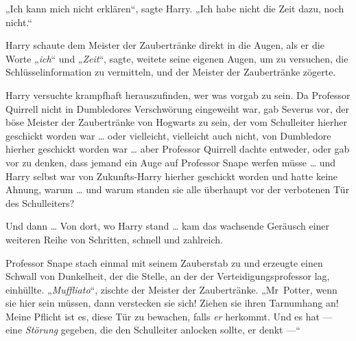 „Ich kann mich nicht erklären“, sagte Harry.
„Ich habe nicht die Zeit dazu, noch nicht.“

Harry schaute dem Meister der Zaubertränke direkt in die Augen, als er die Worte
„\emph{ich}“ und
„\emph{Zeit}“, sagte, weitete seine eigenen Augen, um zu versuchen, die Schlüsselinformation zu vermitteln, und der Meister der Zaubertränke zögerte.

Harry versuchte krampfhaft herauszufinden, wer was vorgab zu sein. Da Professor Quirrell nicht in Dumbledores Verschwörung eingeweiht war, gab Severus vor, der böse Meister der Zaubertränke von Hogwarts zu sein, der vom Schulleiter hierher geschickt worden war … oder vielleicht, vielleicht auch nicht, von Dumbledore hierher geschickt worden war … aber Professor Quirrell dachte entweder, oder gab vor zu denken, dass jemand ein Auge auf Professor Snape werfen müsse … und Harry selbst war von Zukunfts-Harry hierher geschickt worden und hatte keine Ahnung, warum … und warum standen sie alle überhaupt vor der verbotenen Tür des Schulleiters?



Und dann … Von dort, wo Harry stand … kam das wachsende Geräusch einer weiteren Reihe von Schritten, schnell und zahlreich.

Professor Snape stach einmal mit seinem Zauberstab zu und erzeugte einen Schwall von Dunkelheit, der die Stelle, an der der Verteidigungsprofessor lag, einhüllte.
„\emph{Muffliato}“, zischte der Meister der Zaubertränke.
„Mr~Potter, wenn sie hier sein müssen, dann verstecken sie sich! Ziehen sie ihren Tarnumhang an! Meine Pflicht ist es, diese Tür zu bewachen, falls \emph{er} herkommt. Und es hat — eine \emph{Störung} gegeben, die den Schulleiter anlocken sollte, er denkt —“

